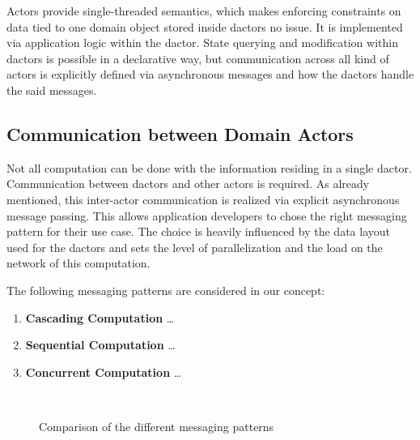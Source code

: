     Actors provide single-threaded semantics, which makes enforcing constraints on data tied to one domain object stored inside \glspl{dactor} no issue.
    It is implemented via application logic within the \gls{dactor}.
    State querying and modification within \glspl{dactor} is possible in a declarative way, but communication across all kind of actors is explicitly defined via asynchronous messages and how the \glspl{dactor} handle the said messages.

  \subsection{Communication between Domain Actors}
    Not all computation can be done with the information residing in a single \gls{dactor}.
    Communication between \glspl{dactor} and other actors is required.
    As already mentioned, this inter-actor communication is realized via explicit asynchronous message passing.
    This allows application developers to chose the right messaging pattern for their use case.
    The choice is heavily influenced by the data layout used for the \glspl{dactor} and sets the level of parallelization and the load on the network of this computation.

    The following messaging patterns are considered in our concept:
    \begin{enumerate}
      \item\label{enum:comp_pattern_1} \textbf{Cascading Computation} \dots
      \item\label{enum:comp_pattern_2} \textbf{Sequential Computation} \dots
      \item\label{enum:comp_pattern_3} \textbf{Concurrent Computation} \dots
    \end{enumerate}


    \begin{figure}
      \centering

      \begin{subfigure}[c]{0.49\textwidth}
        
        \label{fig:comp_pattern_1}
        \hfill\\
        
        \label{fig:comp_pattern_3}
      \end{subfigure}
      \begin{subfigure}[c]{0.5\textwidth}
        
        \label{fig:comp_pattern_2}
      \end{subfigure}
      \caption{Comparison of the different messaging patterns}
      \label{fig:comp_patterns}
    \end{figure}


